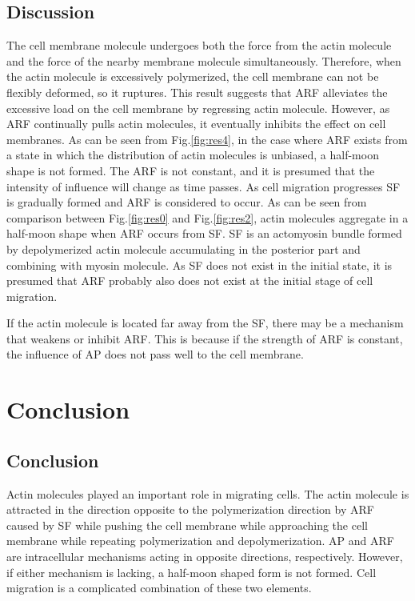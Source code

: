 \documentclass[a4paper,12pt, oneside]{book}
\begin{document}
\section{Discussion}
The cell membrane molecule undergoes both the force from the actin molecule and the force of the nearby membrane molecule simultaneously.
Therefore, when the actin molecule is excessively polymerized, the cell membrane can not be flexibly deformed, so it ruptures. 
This result suggests that ARF alleviates the excessive load on the cell membrane by regressing actin molecule.
However, as ARF continually pulls actin molecules, it eventually inhibits the effect on cell membranes.
As can be seen from Fig.\ref{fig:res4}, in the case where ARF exists from a state in which the distribution of actin molecules is unbiased, a half-moon shape is not formed.
The ARF is not constant, and it is presumed that the intensity of influence will change as time passes.
As cell migration progresses SF is gradually formed and ARF is considered to occur.
As can be seen from comparison between Fig.\ref{fig:res0} and Fig.\ref{fig:res2}, actin molecules aggregate in a half-moon shape when ARF occurs from SF.
SF is an actomyosin bundle formed by depolymerized actin molecule accumulating in the posterior part and combining with myosin molecule.
As SF does not exist in the initial state, it is presumed that ARF probably also does not exist at the initial stage of cell migration.

If the actin molecule is located far away from the SF, there may be a mechanism that weakens or inhibit ARF.
This is because if the strength of ARF is constant, the influence of AP does not pass well to the cell membrane.

\chapter{Conclusion}
\section{Conclusion}
Actin molecules played an important role in migrating cells. The actin molecule is attracted in the direction opposite to the polymerization direction by ARF caused by SF while pushing the cell membrane while approaching the cell membrane while repeating polymerization and depolymerization. AP and ARF are intracellular mechanisms acting in opposite directions, respectively. However, if either mechanism is lacking, a half-moon shaped form is not formed. Cell migration is a complicated combination of these two elements.
\end{document}
